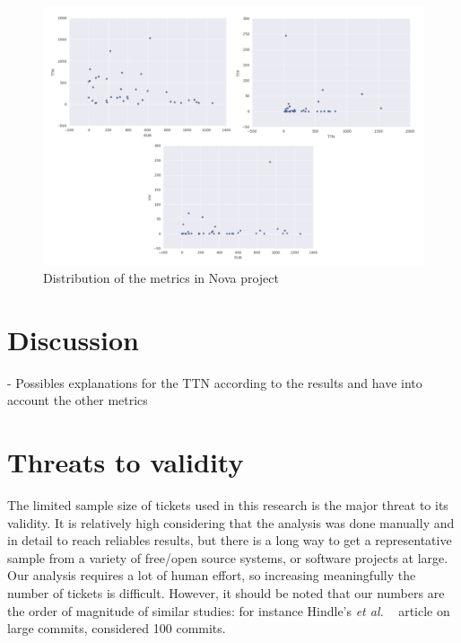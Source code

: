 \documentclass[10pt, conference]{IEEEtran}
\begin{document}
\begin{figure}[ht]
\centering
\includegraphics[width=\columnwidth]{DistributionES_b.png}
\caption{Distribution of the metrics in Nova project}
\label{fig:graph3}       %
\end{figure}


\section{Discussion}
\label{sec:discussion}
- Possibles explanations for the TTN according to the results and have into account the other metrics


\section{Threats to validity}
\label{sec:threats}

The limited sample size of tickets used in this research is the major threat to its validity. It is relatively high considering that the analysis was done manually and in detail to reach reliables results, but there is a long way to get a representative sample from a variety of free/open source systems, or software projects at large. Our analysis requires a lot of human effort, so increasing meaningfully the number of tickets is difficult. However, it should be noted that our numbers are the order of magnitude of similar studies: for instance Hindle's \emph{et al.} ~\cite{hindle2008large} article on large commits, considered 100 commits.
\end{document}
